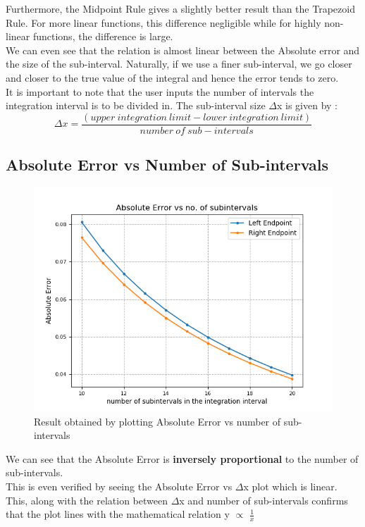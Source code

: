 \documentclass[11pt]{article}
\begin{document}
Furthermore, the Midpoint Rule gives a slightly better result than the Trapezoid Rule. For more linear functions, this difference negligible while for highly non-linear functions, the difference is large.\\

We can even see that the relation is almost linear between the Absolute error and the size of the sub-interval. Naturally, if we use a finer sub-interval, we go closer and closer to the true value of the integral and hence the error tends to zero.\\

It is important to note that the user inputs the number of intervals the integration interval is to be divided in. The sub-interval size $\Delta$x is given by : \[ \Delta x = \frac{(upper~integration~limit - lower~integration~limit)}{number~of~sub-intervals}\]
\subsection{Absolute Error vs Number of Sub-intervals}

\begin{figure}[h!]
	\centering
	\centering
	\includegraphics[width=0.8\linewidth]{abs_error_vs_num_subintervals}
	\caption{Result obtained by plotting Absolute Error vs number of sub-intervals}
	\label{fig4}
\end{figure}

We can see that the Absolute Error is \textbf{inversely proportional} to the number of sub-intervals. \\

This is even verified by seeing the Absolute Error vs $\Delta$x plot which is linear. This, along with the relation between $\Delta$x and number of sub-intervals confirms that the plot lines with the mathematical relation y $\propto$ $\frac{1}{x}$ \\
\end{document}
